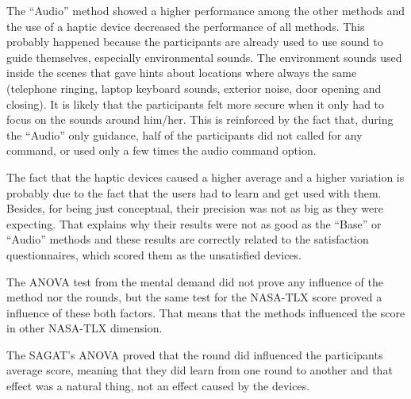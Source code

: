 
% 
%




The “Audio” method showed a higher performance among the other methods and the use of a haptic device decreased the performance of all methods. This probably happened because the participants are already used to use sound to guide themselves, especially environmental sounds. The environment sounds used inside the scenes that gave hints about locations where always the same (telephone ringing, laptop keyboard sounds, exterior noise, door opening and closing). It is likely that the participants felt more secure when it only had to focus on the sounds around him/her. This is reinforced by the fact that, during the “Audio” only guidance, half of the participants did not called for any command, or used only a few times the audio command option.

The fact that the haptic devices caused a higher average and a higher variation is probably due to the fact that the users had to learn and get used with them. Besides, for being just conceptual, their precision was not as big as they were expecting. That explains why their results were not as good as the “Base” or “Audio” methods and these results are correctly related to the satisfaction questionnaires, which scored them as the unsatisfied devices.

The ANOVA test from the mental demand did not prove any influence of the method nor the rounds, but the same test for the NASA-TLX score proved a influence of these both factors. That means that the methods influenced the score in other NASA-TLX dimension.

The SAGAT's ANOVA proved that the round did influenced the participants average score, meaning that they did learn from one round to another and that effect was a natural thing, not an effect caused by the devices.

